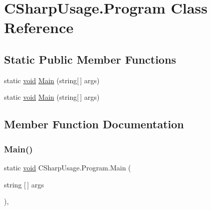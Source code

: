 \hypertarget{classCSharpUsage_1_1Program}{}\section{C\+Sharp\+Usage.\+Program Class Reference}
\label{classCSharpUsage_1_1Program}
\subsection*{Static Public Member Functions}
\begin{DoxyCompactItemize}
\item 
static \mbox{\hyperlink{mlasi_8h_a88f941d423cb2a819b70a1358982b1a6}{void}} \mbox{\hyperlink{classCSharpUsage_1_1Program_ae5f9ba8a4eb6bf47a5af6bea5390b495}{Main}} (string\mbox{[}$\,$\mbox{]} args)
\item 
static \mbox{\hyperlink{mlasi_8h_a88f941d423cb2a819b70a1358982b1a6}{void}} \mbox{\hyperlink{classCSharpUsage_1_1Program_ae5f9ba8a4eb6bf47a5af6bea5390b495}{Main}} (string\mbox{[}$\,$\mbox{]} args)
\end{DoxyCompactItemize}


\subsection{Member Function Documentation}
\mbox{\label{classCSharpUsage_1_1Program_ae5f9ba8a4eb6bf47a5af6bea5390b495}} 
\subsubsection{\texorpdfstring{Main()}{Main()}\hspace{0.1cm}{\footnotesize\ttfamily [1/2]}}
{\footnotesize\ttfamily static \mbox{\hyperlink{mlasi_8h_a88f941d423cb2a819b70a1358982b1a6}{void}} C\+Sharp\+Usage.\+Program.\+Main (\begin{DoxyParamCaption}\item[{string \mbox{[}$\,$\mbox{]}}]{args }\end{DoxyParamCaption})\hspace{0.3cm}{\ttfamily [inline]}, {\ttfamily [static]}}

\mbox{\label{classCSharpUsage_1_1Program_ae5f9ba8a4eb6bf47a5af6bea5390b495}} 
